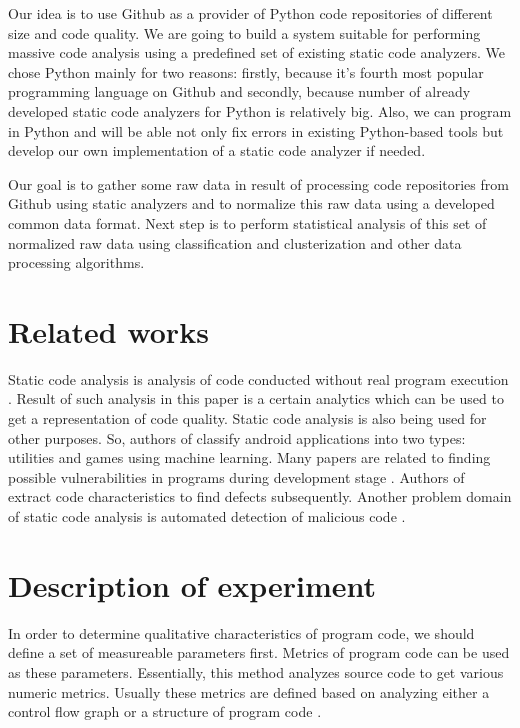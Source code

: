 \documentclass[runningheads,a4paper]{llncs}
\begin{document}
Our idea is to use Github \cite{item16} as a provider of Python code repositories
of different size and code quality. We are going to build a system suitable for
performing massive code analysis using a predefined set of existing static code
analyzers. We chose Python mainly for two reasons: firstly, because it's fourth most popular
programming language on Github and secondly, because number of already developed
static code analyzers for Python is relatively big. Also, we can program in Python
and will be able not only fix errors in existing Python-based tools but develop
our own implementation of a static code analyzer if needed.

Our goal is to gather some raw data in result of processing code repositories from
Github using static analyzers and to normalize this raw data using a developed
common data format. Next step is to perform statistical analysis of this set of
normalized raw data using classification and clusterization and other data processing
algorithms.

\section{Related works}

Static code analysis is analysis of code conducted without real program
execution \cite{item05}. Result of such analysis in this paper is a certain analytics
which can be used to get a representation of code quality. Static code analysis
is also being used for other purposes. So, authors of \cite{item06} classify android
applications into two types: utilities and games using machine learning.
Many papers are related to finding possible vulnerabilities in programs
during development stage \cite{item07,item08,item09}. Authors of \cite{item10} extract code characteristics
to find defects subsequently. Another problem domain of static code analysis
is automated detection of malicious code \cite{item11}.

\section{Description of experiment}

In order to determine qualitative characteristics of program code, we should
define a set of measureable parameters first. Metrics of program code can
be used as these parameters. Essentially, this method analyzes source code
to get various numeric metrics. Usually these metrics are defined based
on analyzing either a control flow graph or a structure of program code \cite{item12}.
\end{document}

